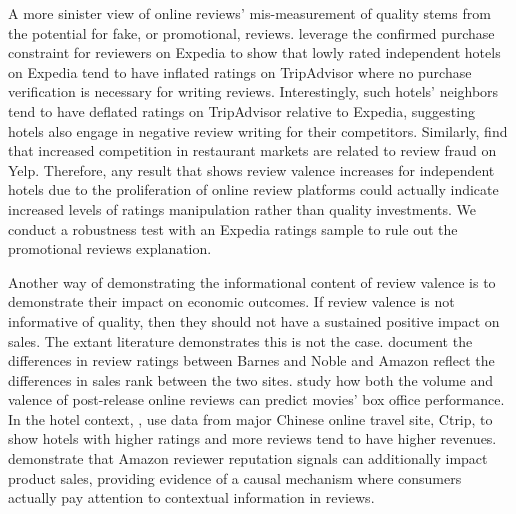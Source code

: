\documentclass[mksc,blindrev]{informs3} %
\begin{document}
A more sinister view of online reviews' mis-measurement of quality stems from the potential for fake, or promotional, reviews. \citet{mayzlin2014promotional} leverage the confirmed purchase constraint for reviewers on Expedia to show that lowly rated independent hotels on Expedia tend to have inflated ratings on TripAdvisor where no purchase verification is necessary for writing reviews. Interestingly, such hotels' neighbors tend to have deflated ratings on TripAdvisor relative to Expedia, suggesting hotels also engage in negative review writing for their competitors. Similarly, \citet{luca2016fake} find that increased competition in restaurant markets are related to review fraud on Yelp. Therefore, any result that shows review valence increases for independent hotels due to the proliferation of online review platforms could actually indicate increased levels of ratings manipulation rather than quality investments. We conduct a robustness test with an Expedia ratings sample to rule out the promotional reviews explanation.

Another way of demonstrating the informational content of review valence is to demonstrate their impact on economic outcomes. If review valence is not informative of quality, then they should not have a sustained positive impact on sales. The extant literature demonstrates this is not the case. \citet{chevalier2006effect} document the differences in review ratings between Barnes and Noble and Amazon reflect the differences in sales rank between the two sites. \citet{dellarocas2007exploring} study how both the volume and valence of post-release online reviews can predict movies' box office performance. In the hotel context, \citet{ye2009impact}, use data from major Chinese online travel site, Ctrip, to show hotels with higher ratings and more reviews tend to have higher revenues. \citet{hu2008online} demonstrate that Amazon reviewer reputation signals can additionally impact product sales, providing evidence of a causal mechanism where consumers actually pay attention to contextual information in reviews. %
\end{document}
